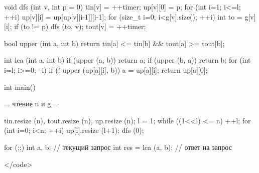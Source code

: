 void dfs (int v, int p = 0) {
	tin[v] = ++timer;
	up[v][0] = p;
	for (int i=1; i<=l; ++i)
		up[v][i] = up[up[v][i-1]][i-1];
	for (size_t i=0; i<g[v].size(); ++i) {
		int to = g[v][i];
		if (to != p)
			dfs (to, v);
	}
	tout[v] = ++timer;
}

bool upper (int a, int b) {
	return tin[a] <= tin[b] && tout[a] >= tout[b];
}

int lca (int a, int b) {
	if (upper (a, b))  return a;
	if (upper (b, a))  return b;
	for (int i=l; i>=0; --i)
		if (! upper (up[a][i], b))
			a = up[a][i];
	return up[a][0];
}

int main() {

	... чтение n и g ...

	tin.resize (n),  tout.resize (n),  up.resize (n);
	l = 1;
	while ((1<<l) <= n)  ++l;
	for (int i=0; i<n; ++i)  up[i].resize (l+1);
	dfs (0);

	for (;;) {
		int a, b; // текущий запрос
		int res = lca (a, b); // ответ на запрос
	}

}</code>